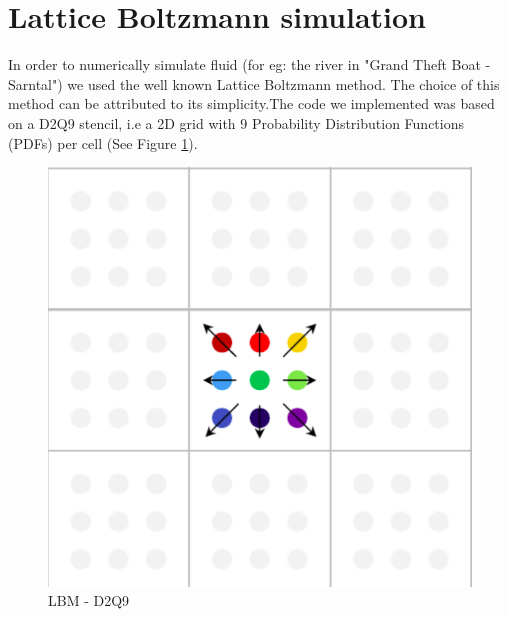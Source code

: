\section{Lattice Boltzmann simulation}
In order to numerically simulate fluid (for eg: the river in "Grand Theft Boat - Sarntal") we used the well known Lattice Boltzmann method. The choice
of this method can be attributed to its simplicity.The code we implemented was based on a D2Q9 stencil, i.e a 2D grid with 9 Probability Distribution Functions (PDFs) per cell (See Figure \ref{fig: D2Q9 push scheme}). 

	
\begin{figure} [h]
\centering
\includegraphics[scale=0.4]{img/LBM/D2Q9_push}
\caption{LBM - D2Q9}
\label{fig: D2Q9 push scheme}
\end{figure}

